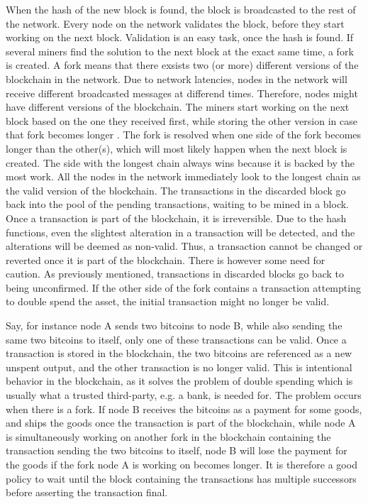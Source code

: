 When the hash of the new block is found, the block is broadcasted to the rest of the network. Every node on the network validates the block, before they start working on the next block. Validation is an easy task, once the hash is found. If several miners find the solution to the next block at the exact same time, a fork is created. 
A fork means that there exsists two (or more) different versions of the blockchain in the network. Due to network latencies, nodes in the network will receive different broadcasted messages at differend times. Therefore, nodes might have different versions of the blockchain. The miners start working on the next block based on the one they received first, while storing the other version in case that fork becomes longer \cite{Nakamoto_bitcoin}. The fork is resolved when one side of the fork becomes longer than the other(s), which will most likely happen when the next block is created. The side with the longest chain always wins because it is backed by the most work. All the nodes in the network immediately look to the longest chain as the valid version of the blockchain. The transactions in the discarded block go back into the pool of the pending transactions, waiting to be mined in a block. Once a transaction is part of the blockchain, it is irreversible. Due to the hash functions, even the slightest alteration in a transaction will be detected, and the alterations will be deemed as non-valid. Thus, a transaction cannot be changed or reverted once it is part of the blockchain. There is however some need for caution. As previously mentioned, transactions in discarded blocks go back to being unconfirmed. If the other side of the fork contains a transaction attempting to double spend the asset, the initial transaction might no longer be valid. 

Say, for instance node A sends two bitcoins to node B, while also sending the same two bitcoins to itself, only one of these transactions can be valid. Once a transaction is stored in the blockchain, the two bitcoins are referenced as a new unspent output, and the other transaction is no longer valid. This is intentional behavior in the blockchain, as it solves the problem of double spending which is usually what a trusted third-party, e.g. a bank, is needed for. The problem occurs when there is a fork. If node B receives the bitcoins as a payment for some goods, and ships the goods once the transaction is part of the blockchain, while node A is simultaneously working on another fork in the blockchain containing the transaction sending the two bitcoins to itself, node B will lose the payment for the goods if the fork node A is working on becomes longer. It is therefore a good policy to wait until the block containing the transactions has multiple successors before asserting the transaction final.



